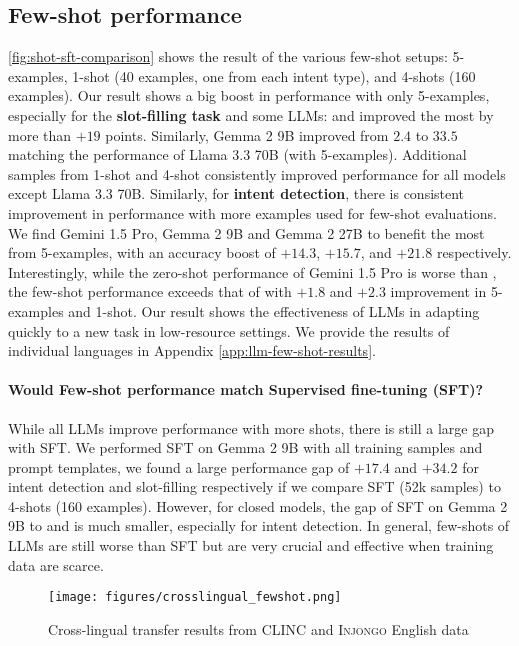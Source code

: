\subsection{Few-shot performance}
\autoref{fig:shot-sft-comparison} shows the result of the various few-shot setups: 5-examples, 1-shot (40 examples, one from each intent type), and 4-shots (160 examples). Our result shows a big boost in performance with only 5-examples, especially for the \textbf{slot-filling task} and some LLMs: \gpto and \gemini improved the most by more than $+19$ points. Similarly, Gemma 2 9B improved from $2.4$ to $33.5$ matching the performance of Llama 3.3 70B (with 5-examples). Additional samples from 1-shot and 4-shot consistently improved performance for all models except Llama 3.3 70B. Similarly, for \textbf{intent detection}, there is consistent improvement in performance with more examples used for few-shot evaluations. We find Gemini 1.5 Pro, Gemma 2 9B and Gemma 2 27B to benefit the most from 5-examples, with an accuracy boost of $+14.3$, $+15.7$, and $+21.8$ respectively. Interestingly,  while the zero-shot performance of Gemini 1.5 Pro is worse than \gpto, the few-shot performance exceeds that of \gpto with $+1.8$ and $+2.3$ improvement in 5-examples and 1-shot.  Our result shows the effectiveness of LLMs in adapting quickly to a new task in low-resource settings. We provide the results of individual languages in Appendix \ref{app:llm-few-shot-results}.

\paragraph{Would Few-shot performance match Supervised fine-tuning (SFT)?} While all LLMs improve performance with more shots, there is still a large gap with SFT. We performed SFT on Gemma 2 9B with all training samples and prompt templates, we found a large performance gap of $+17.4$ and $+34.2$ for intent detection and slot-filling respectively if we compare SFT (52k samples) to 4-shots (160 examples). However, for closed models, the gap of SFT on Gemma 2 9B to \gemini and \gpto is much smaller, especially for intent detection. In general, few-shots of LLMs are still worse than SFT but are very crucial and effective when training data are scarce. 

\begin{figure}
    \centering
    \texttt{[image: figures/crosslingual\_fewshot.png]}
    \vspace{-7mm}
    \caption{Cross-lingual transfer results from \textsc{CLINC} and \textsc{Injongo} English data}
    \label{fig:cross-lingual-transfer}
    \vspace{-1em}
\end{figure}


